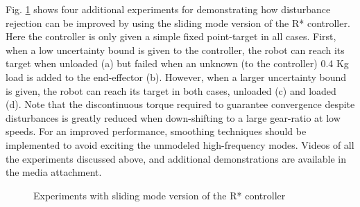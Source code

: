 Fig. \ref{fig:rob} shows four additional experiments for demonstrating how disturbance rejection can be improved by using the sliding mode version of the R* controller. Here the controller is only given a simple fixed point-target in all cases. First, when a low uncertainty bound is given to the controller, the robot can reach its target when unloaded (a) but failed when an unknown (to the controller) 0.4 Kg load is added to the end-effector (b). However, when a larger uncertainty bound is given, the robot can reach its target in both cases, unloaded (c) and loaded (d). Note that the discontinuous torque required to guarantee convergence despite disturbances is greatly reduced when down-shifting to a large gear-ratio at low speeds. For an improved performance, smoothing techniques should be implemented to avoid exciting the unmodeled high-frequency modes. Videos of all the experiments discussed above, and additional demonstrations are available in the media attachment.

\begin{figure}[htp]
        \centering
				\hspace{-10pt}
				\hspace{-5pt}
				\hspace{-5pt}
				\hspace{-5pt}
        \caption{Experiments with sliding mode version of the R* controller }
				\label{fig:rob}
\end{figure}
